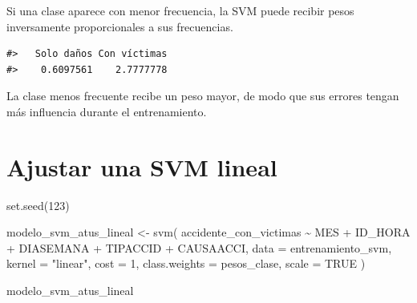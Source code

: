 \documentclass[
  spanish,
  10.5pt,
  letterpaper,
  openany,
  headings=big]{scrbook}
\newenvironment{Shaded}{}{}
\newcommand{\AttributeTok}[1]{\textcolor[rgb]{0.84,0.23,0.29}{#1}}
\newcommand{\ConstantTok}[1]{\textcolor[rgb]{0.00,0.36,0.77}{#1}}
\newcommand{\DecValTok}[1]{\textcolor[rgb]{0.00,0.36,0.77}{#1}}
\newcommand{\FunctionTok}[1]{\textcolor[rgb]{0.44,0.26,0.76}{#1}}
\newcommand{\NormalTok}[1]{\textcolor[rgb]{0.14,0.16,0.18}{#1}}
\newcommand{\OtherTok}[1]{\textcolor[rgb]{0.44,0.26,0.76}{#1}}
\newcommand{\SpecialCharTok}[1]{\textcolor[rgb]{0.00,0.36,0.77}{#1}}
\newcommand{\StringTok}[1]{\textcolor[rgb]{0.01,0.18,0.38}{#1}}
\begin{document}
Si una clase aparece con menor frecuencia, la SVM puede recibir pesos
inversamente proporcionales a sus frecuencias.

\begin{Shaded}
\end{Shaded}

\begin{verbatim}
#>   Solo daños Con víctimas 
#>    0.6097561    2.7777778
\end{verbatim}

La clase menos frecuente recibe un peso mayor, de modo que sus errores
tengan más influencia durante el entrenamiento.

\section{Ajustar una SVM lineal}\label{ajustar-una-svm-lineal}

\begin{Shaded}
\begin{Highlighting}[]
\FunctionTok{set.seed}\NormalTok{(}\DecValTok{123}\NormalTok{)}

\NormalTok{modelo\_svm\_atus\_lineal }\OtherTok{\textless{}{-}} \FunctionTok{svm}\NormalTok{(}
\NormalTok{  accidente\_con\_victimas }\SpecialCharTok{\textasciitilde{}}
\NormalTok{    MES }\SpecialCharTok{+}\NormalTok{ ID\_HORA }\SpecialCharTok{+}\NormalTok{ DIASEMANA }\SpecialCharTok{+}\NormalTok{ TIPACCID }\SpecialCharTok{+}\NormalTok{ CAUSAACCI,}
  \AttributeTok{data =}\NormalTok{ entrenamiento\_svm,}
  \AttributeTok{kernel =} \StringTok{"linear"}\NormalTok{,}
  \AttributeTok{cost =} \DecValTok{1}\NormalTok{,}
  \AttributeTok{class.weights =}\NormalTok{ pesos\_clase,}
  \AttributeTok{scale =} \ConstantTok{TRUE}
\NormalTok{)}

\NormalTok{modelo\_svm\_atus\_lineal}
\end{Highlighting}
\end{Shaded}
\end{document}
